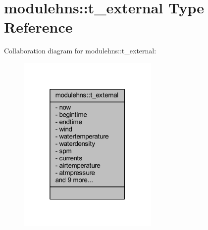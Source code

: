 \hypertarget{structmodulehns_1_1t__external}{}\section{modulehns\+:\+:t\+\_\+external Type Reference}
\label{structmodulehns_1_1t__external}


Collaboration diagram for modulehns\+:\+:t\+\_\+external\+:\nopagebreak
\begin{figure}[H]
\begin{center}
\leavevmode
\includegraphics[width=193pt]{structmodulehns_1_1t__external__coll__graph}
\end{center}
\end{figure}
